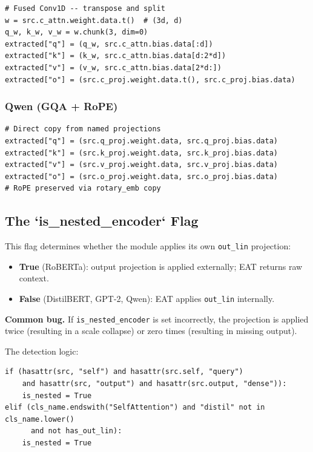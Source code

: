 \begin{lstlisting}
# Fused Conv1D -- transpose and split
w = src.c_attn.weight.data.t()  # (3d, d)
q_w, k_w, v_w = w.chunk(3, dim=0)
extracted["q"] = (q_w, src.c_attn.bias.data[:d])
extracted["k"] = (k_w, src.c_attn.bias.data[d:2*d])
extracted["v"] = (v_w, src.c_attn.bias.data[2*d:])
extracted["o"] = (src.c_proj.weight.data.t(), src.c_proj.bias.data)
\end{lstlisting}

\subsubsection{Qwen (GQA + RoPE)}

\begin{lstlisting}
# Direct copy from named projections
extracted["q"] = (src.q_proj.weight.data, src.q_proj.bias.data)
extracted["k"] = (src.k_proj.weight.data, src.k_proj.bias.data)
extracted["v"] = (src.v_proj.weight.data, src.v_proj.bias.data)
extracted["o"] = (src.o_proj.weight.data, src.o_proj.bias.data)
# RoPE preserved via rotary_emb copy
\end{lstlisting}

\subsection{The `is\_nested\_encoder` Flag}

This flag determines whether the module applies its own \texttt{out\_lin} projection:

\begin{itemize}
\item \textbf{True} (RoBERTa): output projection is applied externally; EAT returns
  raw context.
\item \textbf{False} (DistilBERT, GPT-2, Qwen): EAT applies \texttt{out\_lin} internally.

\end{itemize}
\textbf{Common bug.} If \texttt{is\_nested\_encoder} is set incorrectly, the projection 
is applied twice (resulting in a scale collapse) or zero times (resulting 
in missing output).

The detection logic:

\begin{lstlisting}
if (hasattr(src, "self") and hasattr(src.self, "query")
    and hasattr(src, "output") and hasattr(src.output, "dense")):
    is_nested = True
elif (cls_name.endswith("SelfAttention") and "distil" not in cls_name.lower()
      and not has_out_lin):
    is_nested = True
\end{lstlisting}

